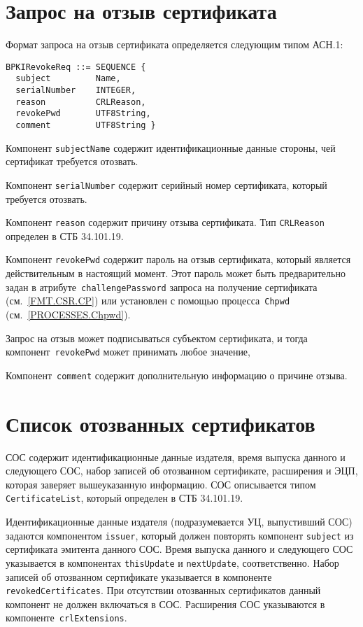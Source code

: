 \section{Запрос на отзыв сертификата}\label{FMT.BPKIRevokeReq}

Формат запроса на отзыв сертификата определяется следующим типом АСН.1:
\begin{verbatim}
BPKIRevokeReq ::= SEQUENCE {
  subject         Name,
  serialNumber    INTEGER,
  reason          CRLReason,
  revokePwd       UTF8String,
  comment         UTF8String }
\end{verbatim}

Компонент \texttt{subjectName} содержит идентификационные 
данные стороны, чей сертификат требуется отозвать. 

Компонент \texttt{serialNumber} содержит серийный номер 
сертификата, который требуется отозвать.

Компонент \texttt{reason} содержит причину отзыва сертификата. 
Тип \texttt{CRLReason} определен в СТБ 34.101.19.

Компонент \texttt{revokePwd} содержит пароль на отзыв 
сертификата, который является действительным в 
настоящий момент. Этот пароль может быть предварительно
задан в атрибуте~\texttt{challengePassword} запроса на получение сертификата 
(см.~\ref{FMT.CSR.CP}) или установлен с помощью процесса~\texttt{Chpwd} 
(см.~\ref{PROCESSES.Chpwd}). 

Запрос на отзыв может подписываться субъектом сертификата,
и тогда компонент~\texttt{revokePwd} может принимать любое значение,

Компонент~\texttt{comment} содержит дополнительную информацию 
о причине отзыва.
 
\section{Список отозванных сертификатов}\label{FMT.CRL}

СОС содержит идентификационные данные издателя, время выпуска данного и 
следующего СОС, набор записей об отозванном сертификате, расширения и ЭЦП, 
которая заверяет вышеуказанную информацию. СОС описывается типом 
\texttt{CertificateList}, который определен в СТБ 34.101.19.
 
Идентификационные данные издателя (подразумевается УЦ, 
выпустивший СОС) задаются компонентом \texttt{issuer}, 
который должен повторять компонент \texttt{subject} из 
сертификата эмитента данного СОС.  
%
Время выпуска данного и следующего СОС указывается в 
компонентах \texttt{thisUpdate} и \texttt{nextUpdate}, 
соответственно.
%
Набор записей об отозванном сертификате указывается в компоненте 
\texttt{revokedCertificates}. При отсутствии отозванных  
сертификатов данный компонент не должен включаться в СОС.
%
Расширения СОС указываются в компоненте~\texttt{crlExtensions}.

